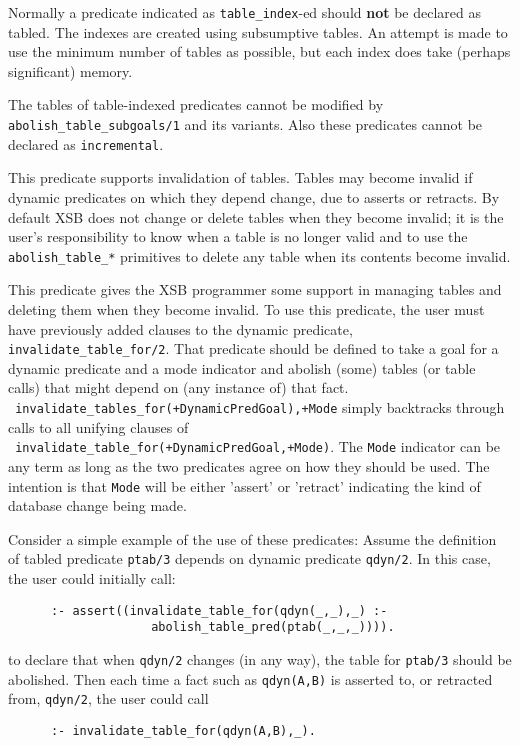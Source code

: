 \begin{description}
\begin{description}
Normally a predicate indicated as {\tt table\_index}-ed should {\bf
  not} be declared as tabled.  The indexes are created using
subsumptive tables.  An attempt is made to use the minimum number of
tables as possible, but each index does take (perhaps significant)
memory.  

The tables of table-indexed predicates cannot be modified by {\tt
  abolish\_table\_subgoals/1} and its variants.  Also these predicates
cannot be declared as {\tt incremental}.


%
This predicate supports invalidation of tables.  Tables may become
invalid if dynamic predicates on which they depend change, due to
asserts or retracts.  By default XSB does not change or delete tables
when they become invalid; it is the user's responsibility to know when
a table is no longer valid and to use the {\tt abolish\_table\_*}
primitives to delete any table when its contents become invalid.

This predicate gives the XSB programmer some support in managing
tables and deleting them when they become invalid.  To use this
predicate, the user must have previously added clauses to the dynamic
predicate, {\tt invalidate\_table\_for/2}.  That predicate should be
defined to take a goal for a dynamic predicate and a mode indicator
and abolish (some) tables (or table calls) that might depend on (any
instance of) that fact.  \\ {\tt
invalidate\_tables\_for(+DynamicPredGoal),+Mode} simply backtracks
through calls to all unifying clauses of \\ {\tt
invalidate\_table\_for(+DynamicPredGoal,+Mode)}.  The {\tt Mode}
indicator can be any term as long as the two predicates agree on how
they should be used.  The intention is that {\tt Mode} will be either
'assert' or 'retract' indicating the kind of database change being
made.

Consider a simple example of the use of these predicates: Assume the
definition of tabled predicate {\tt ptab/3} depends on dynamic predicate
{\tt qdyn/2}.  In this case, the user could initially call:
\begin{verbatim}
      :- assert((invalidate_table_for(qdyn(_,_),_) :-
                    abolish_table_pred(ptab(_,_,_)))).
\end{verbatim}
to declare that when {\tt qdyn/2} changes (in any way), the table for {\tt ptab/3}
should be abolished.  Then each time a fact such as {\tt qdyn(A,B)} is
asserted to, or retracted from, {\tt qdyn/2}, the user could call
\begin{verbatim}
      :- invalidate_table_for(qdyn(A,B),_).
\end{verbatim}


\end{description}
\end{description}
